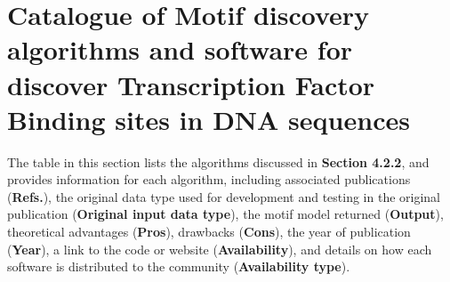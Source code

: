 \documentclass[a4paper, titlepage, openright]{book}
\begin{document}
\section{Catalogue of Motif discovery algorithms and software for discover Transcription Factor Binding sites in DNA sequences}\label{section:algorithms-table-appendix}
The table in this section lists the algorithms discussed in \textbf{Section 4.2.2}, and provides information for each algorithm, including associated publications (\textbf{Refs.}), the original data type used for development and testing in the original publication (\textbf{Original input data type}), the motif model returned (\textbf{Output}), theoretical advantages (\textbf{Pros}), drawbacks (\textbf{Cons}), the year of publication (\textbf{Year}), a link to the code or website (\textbf{Availability}), and details on how each software is distributed to the community (\textbf{Availability type}).
\end{document}
